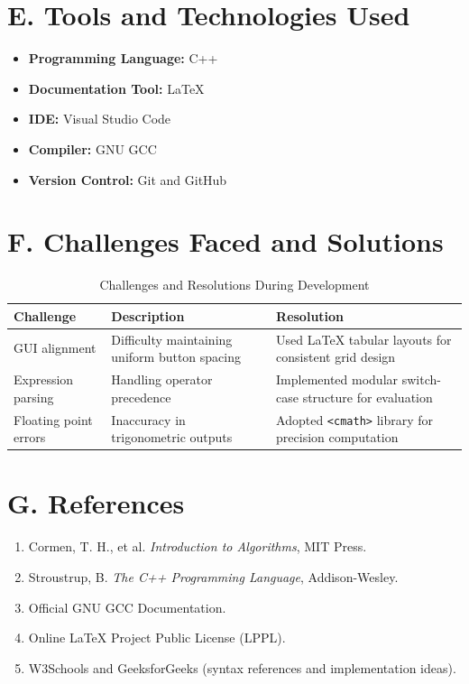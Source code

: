 \documentclass[a4paper,12pt,oneside]{report}
\numberwithin{equation}{chapter}
\numberwithin{figure}{chapter}
\numberwithin{table}{chapter}
\begin{document}
\section*{E. Tools and Technologies Used}
\begin{itemize}
    \item \textbf{Programming Language:} C++
    \item \textbf{Documentation Tool:} LaTeX
    \item \textbf{IDE:} Visual Studio Code
    \item \textbf{Compiler:} GNU GCC
    \item \textbf{Version Control:} Git and GitHub
\end{itemize}

\section*{F. Challenges Faced and Solutions}

\begin{table}[H]
\centering
\begin{tabular}{|p{3cm}|p{5cm}|p{5cm}|}
\hline
\textbf{Challenge} & \textbf{Description} & \textbf{Resolution} \\ \hline
GUI alignment & Difficulty maintaining uniform button spacing & Used \LaTeX{} tabular layouts for consistent grid design \\ \hline
Expression parsing & Handling operator precedence & Implemented modular switch-case structure for evaluation \\ \hline
Floating point errors & Inaccuracy in trigonometric outputs & Adopted \texttt{<cmath>} library for precision computation \\ \hline
\end{tabular}
\caption{Challenges and Resolutions During Development}
\end{table}

\section*{G. References}
\begin{enumerate}
    \item Cormen, T. H., et al. \textit{Introduction to Algorithms}, MIT Press.
    \item Stroustrup, B. \textit{The C++ Programming Language}, Addison-Wesley.
    \item Official GNU GCC Documentation.
    \item Online \LaTeX{} Project Public License (LPPL).
    \item W3Schools and GeeksforGeeks (syntax references and implementation ideas).
\end{enumerate}
\end{document}
